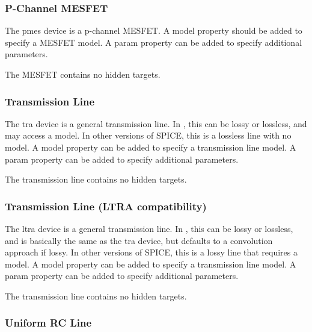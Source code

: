 \subsubsection{P-Channel MESFET}

The {\et pmes} device is a p-channel MESFET.  A {\et model} property
should be added to specify a MESFET model.  A {\et param} property can
be added to specify additional parameters.

The MESFET contains no hidden targets.

\subsubsection{Transmission Line}

The {\et tra} device is a general transmission line.  In {\WRspice},
this can be lossy or lossless, and may access a model.  In other
versions of SPICE, this is a lossless line with no model.  A {\et
model} property can be added to specify a transmission line model.  A
{\et param} property can be added to specify additional parameters.

The transmission line contains no hidden targets.

\subsubsection{Transmission Line (LTRA compatibility)}

The {\et ltra} device is a general transmission line.  In {\WRspice},
this can be lossy or lossless, and is basically the same as the {\et
tra} device, but defaults to a convolution approach if lossy.  In
other versions of SPICE, this is a lossy line that requires a model. 
A {\et model} property can be added to specify a transmission line
model.  A {\et param} property can be added to specify additional
parameters.

The transmission line contains no hidden targets.

\subsubsection{Uniform RC Line}

